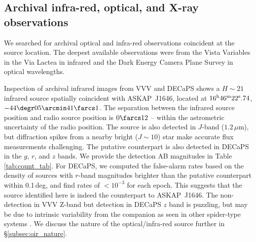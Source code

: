 \documentclass[fleqn,usenatbib]{mnras}
\newcommand{\todo}[1]{\textcolor{red}{TODO: #1}\PackageWarning{TODO:}{#1!}}
\newcommand{\blinkyaskap}{{ASKAP}~J1646}
\begin{document}
\subsection{Archival infra-red, optical, and X-ray observations}



We searched for archival optical and infra-red observations coincident at the source location. The deepest available observations were from the Vista Variables in the Via Lactea \citep[VVV;][]{2010NewA...15..433M} in infrared and the Dark Energy Camera Plane Survey  \citep[DECaPS; ][]{2023ApJS..264...28S} in optical wavelengths.

Inspection of archival infrared images from VVV and DECaPS shows a $H\sim21$ infrared source spatially coincident with \blinkyaskap{}, located at $16^{\rm h}46^{\rm m}22^{\rm s}.74$, $-44\degr05\arcmin41\farcs1$. The separation between the infrared source position and radio source position is $0\farcs12$ --  within the astrometric uncertainty of the radio position. The source is also detected in $J$-band ($1.2\,\mu$m), but diffraction spikes from a nearby bright ($J\sim 10$) star make accurate flux measurements challenging. The putative counterpart is also detected in DECaPS in the $g$, $r$, and $z$ bands. We provide the detection AB magnitudes in Table \ref{tab:count_tab}. For DECaPS, we computed the false-alarm rates based on the density of sources with $r$-band magnitudes brighter than the putative counterpart within 0.1\,deg, and find rates of $< 10^{-3}$ for each epoch.  This suggests that the source identified here is indeed the counterpart to \blinkyaskap{}.  The non-detection in VVV Z-band but detection in DECaPS $z$ band is puzzling, but may be due to intrinsic variability from the companion as seen in other spider-type systems \citep[e.g.,][]{2019ApJ...883..108D}. We discuss the nature of the optical/infra-red source further in \S \ref{subsec:oir_nature}. %
\end{document}
